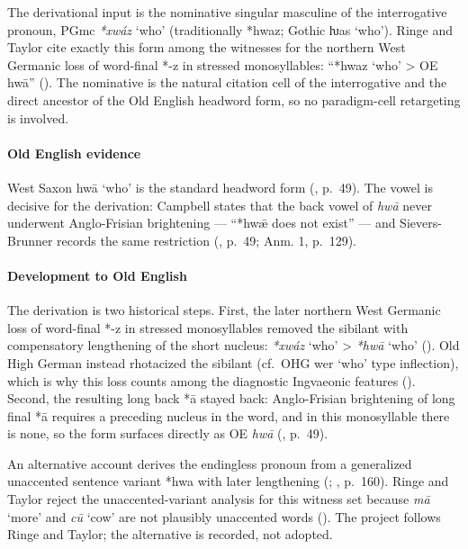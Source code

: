 \documentclass[
  british,
  a4paper,
]{article}
\newcounter{none} %
\providecommand{\Recon}[1]{\emph{*#1}}
\begin{document}
The derivational input is the nominative singular masculine of the
interrogative pronoun, PGmc \Recon{xwáz} `who' (traditionally *hwaz;
Gothic {ƕas} `who'). Ringe and Taylor cite exactly this form among the
witnesses for the northern West Germanic loss of word-final *-z in
stressed monosyllables: ``*hwaz `who' \textgreater{} OE hwā''
(). The
nominative is the natural citation cell of the interrogative and the
direct ancestor of the Old English headword form, so no paradigm-cell
retargeting is involved.

\paragraph{Old English evidence}\label{old-english-evidence-74}

West Saxon {hwā} `who' is the standard headword form
(, p.~49). The
vowel is decisive for the derivation: Campbell states that the back
vowel of \emph{hwā} never underwent Anglo-Frisian brightening --- ``*hwǣ
does not exist'' --- and Sievers-Brunner records the same restriction
(, p.~49;
 Anm. 1,
p.~129).

\paragraph{Development to Old
English}\label{development-to-old-english-74}

The derivation is two historical steps. First, the later northern West
Germanic loss of word-final *-z in stressed monosyllables removed the
sibilant with compensatory lengthening of the short nucleus:
\Recon{xwáz} `who' \textgreater{} \Recon{hwā} `who'
(). Old High
German instead rhotacized the sibilant (cf.~OHG {wer} `who' type
inflection), which is why this loss counts among the diagnostic
Ingvaeonic features (). Second,
the resulting long back *ā stayed back: Anglo-Frisian brightening of
long final *ā requires a preceding nucleus in the word, and in this
monosyllable there is none, so the form surfaces directly as OE
\emph{hwā} (,
p.~49).

An alternative account derives the endingless pronoun from a generalized
unaccented sentence variant *hwa with later lengthening
(;
, p.~160).
Ringe and Taylor reject the unaccented-variant analysis for this witness
set because \emph{mā} `more' and \emph{cū} `cow' are not plausibly
unaccented words (). The project follows Ringe and Taylor; the alternative is recorded,
not adopted.
\end{document}
